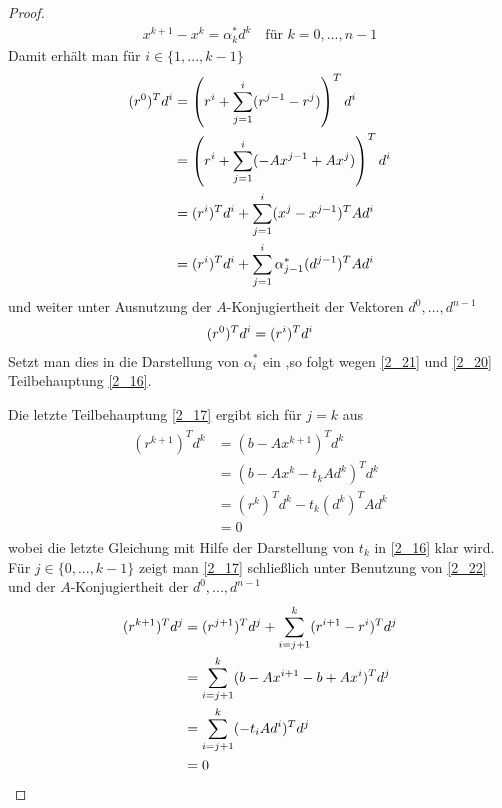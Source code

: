 \begin{proof}
	\begin{align}
		\label{2_21}
		x^{k+1} -x^k = \alpha_k^\ast d^k\quad\text{für } k=0,...,n-1
	\end{align}
	Damit erhält man für $i\in\{1,...,k-1\}$
	\begin{align}
		(r^0)^T d^i &= \left(r^i + \sum_{j=1}^{i} (r^{j-1}-r^j)\right)^Td^i \notag \\
		&= \left(r^i + \sum_{j=1}^i (-Ax^{j-1} + Ax^j)\right)^T d^i \notag \\
		&= (r^i)^Td^i + \sum_{j=1}^i (x^j-x^{j-1})^T Ad^i \notag \\
		&= (r^i)^Td^i + \sum_{j=1}^i \alpha^\ast_{j-1}(d^{j-1})^TAd^i \notag
	\end{align}
	und weiter unter Ausnutzung der $A$-Konjugiertheit der Vektoren $d^0,...,d^{n-1}$
	\begin{align}
		(r^0)^Td^i = (r^i)^Td^i\notag
	\end{align}
	Setzt man dies in die Darstellung von $\alpha_i^\ast$ ein ,so folgt wegen \cref{2_21} und \cref{2_20} Teilbehauptung \cref{2_16}.
	
	Die letzte Teilbehauptung \cref{2_17} ergibt sich für $j=k$ aus
	\begin{align}
		\label{2_22}
		\begin{split}
		(r^{k+1})^Td^k &= (b-Ax^{k+1})^Td^k \\
		&= (b-Ax^k-t_kAd^k)^Td^k \\
		&= (r^k)^Td^k-t_k(d^k)^TAd^k \\
		&= 0
		\end{split}
	\end{align}
	wobei die letzte Gleichung mit Hilfe der Darstellung von $t_k$ in \cref{2_16} klar wird. Für $j\in\{0,...,k-1\}$ zeigt man \cref{2_17} schließlich unter Benutzung von \cref{2_22} und der $A$-Konjugiertheit der $d^0,...,d^{n-1}$
	\begin{align}
		(r^{k+1})^Td^j &= (r^{j+1})^Td^j + \sum_{i=j+1}^k (r^{i+1}-r^i)^Td^j \notag \\
		&= \sum_{i=j+1}^k (b-Ax^{i+1}-b+Ax^i)^Td^j \notag \\
		&= \sum_{i=j+1}^k (-t_iAd^i)^Td^j \notag \\
		&= 0 \notag
	\end{align}
\end{proof}

